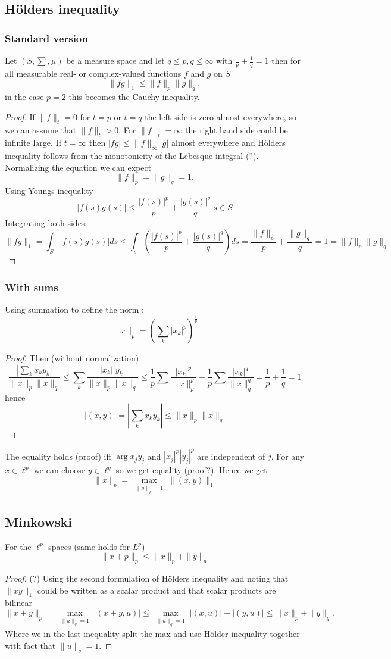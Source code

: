 \documentclass[titlepage]{article}
\begin{document}
\subsection{Hölders inequality}
\subsubsection{Standard version}
Let $(S,\sum, \mu)$ be a measure space and let $q \leq p, q \leq \infty$ with $\frac{1}{p}+ \frac{1}{q} = 1$ then for all measurable real- or complex-valued functions $f$ and $g$ on $S$
$$\|fg\|_1 \leq \|f\|_p \|g\|_q,$$
in the case $p = 2$ this becomes the Cauchy inequality.
\begin{proof}
If $\|f\|_{t} = 0$ for $t = p$ or $t = q$ the left side is zero almost everywhere, so we can assume that $\|f\|_t > 0$. For $\|f\|_{t}= \infty$ the right hand side could be infinite large. 
If $t = \infty$ then $|fg|\leq\|f\|_\infty|g|$ almost everywhere and Hölders inequality follows from the monotonicity of the Lebesque integral (?). Normalizing the equation we can expect
$$\|f\|_p = \|g\|_q = 1.$$
Using Youngs inequality
$$|f(s) g(s)| \leq \frac{|f(s)|^p}{p} + \frac{|g(s)| ^q}{q} \; s\in S$$
Integrating both sides:
$$\|fg\|_1 = \int_S |f(s)g(s)| ds \leq \int_s \left(\frac{|f(s)|^p}{p} + \frac{|g(s)| ^q}{q} \right) ds = \frac{\|f\|_p}{p} + \frac{\|g\|_q}{q} = 1 = \|f\|_p \|g\|_q $$
\end{proof}
\subsubsection{With sums}
Using summation to define the norm :
$$\|x\|_p = \left(\sum_k|x_k|^p\right)^{\frac{1}{p}}$$
\begin{proof}


Then (without normalization)
$$\frac{|\sum_kx_ky_k|}{\|x\|_p\|x\|_q} \leq  \sum_k\frac{|x_k||y_k|}{\|x\|_p\|x\|_q} \leq  \frac{1}{p}\sum \frac{|x_k|^p}{\|x\|_p^p}+ \frac{1}{p}\sum \frac{|x_k|^q}{\|x\|_q^q} = \frac{1}{p} + \frac{1}{q} = 1$$
hence
$$|(x,y)|= |\sum_kx_ky_k| \leq {\|x\|_p\|x\|_q}$$
\end{proof}
The equality holds (proof) iff $\arg x_jy_j$  and $|x_j|^p|y_j|^p$ are independent of $j$. For any $x\in \ell^p$ we can choose $y\in \ell^q$ so we get equality (proof?). Hence we get 
$$ \|x\|_p = \max\limits_{\substack{\|y\|_q = 1}}\|(x,y)\|_1$$

\subsection{Minkowski}
For the $\ell^p$ spaces (same holds for $L^p$)
$$\|x+p\|_p \leq\|x\|_p+ \|y\|_p$$
\begin{proof}
(?)
Using the second formulation of Hölders inequality and noting that $\|xy\|_1$ could be written as a scalar product and that scalar products are bilinear
$$\|x+y\|_p = \max\limits_{\substack{\|u\|_q = 1}}|(x+y,u)| \leq
\max\limits_{\substack{\|u\|_q = 1}}|(x,u)|+ |(y,u)| \leq \|x\|_p +\|y\|_q.$$
Where we in the last inequality split the max and use Hölder inequality together with fact that $\|u\|_q = 1.$
\end{proof}
\end{document}
